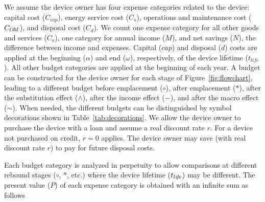 
We assume the device owner has four expense categories 
related to the device:
capital cost ($C_{cap}$), 
energy service cost ($C_s$), 
operations and maintenance cost ($C_{O\!M}$), and
disposal cost ($C_d$).
We count one expense category for all other
goods and services ($C_o$),
one category for annual income ($M$), and 
net savings ($N$), 
the difference between income and expenses.
Capital ($cap$) and disposal ($d$) costs are applied
at the beginning ($\alpha$) and end ($\omega$), respectively, 
of the device lifetime ($t_{life}$).
All other budget categories are 
applied at the beginning of each year.
A budget can be constructed for the device owner for each stage
of Figure~\ref{fig:flowchart}, 
leading to a different budget 
before emplacement ($\circ$), 
after emplacement ($*$), 
after the substitution effect ($\wedge$), 
after the income effect ($-$), and 
after the macro effect ($\sim$).
When needed, 
the different budgets can be distinguished by symbol decorations
shown in Table~\ref{tab:decorations}.
We allow the device owner to purchase the device 
with a loan and assume a real discount rate $r$.
For a device not purchased on credit,
$r = 0$ applies.
The device owner may save (with real discount rate $r$)
to pay for future disposal costs.

Each budget category is analyzed in perpetuity
to allow comparisons at different rebound stages 
($\circ$, $*$, etc.)
where the device lifetime ($t_{li\!f\!e}$) may be different.
The present value ($P$) of each expense category is obtained
with an infinite sum as follows


